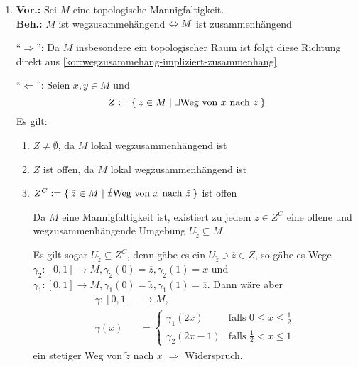 \begin{solution}[\ref{ub4:aufg1}]
    \begin{enumerate}[label=(\alph*)]
        \item \textbf{Vor.:} Sei $M$ eine topologische Mannigfaltigkeit.\\
              \textbf{Beh.:} $M$ ist wegzusammehängend $\Leftrightarrow M$ ist zusammenhängend
              \begin{beweis}
                \enquote{$\Rightarrow$}: Da $M$ insbesondere ein
                topologischer Raum ist folgt diese Richtung direkt
                aus \cref{kor:wegzusammehang-impliziert-zusammenhang}.

                \enquote{$\Leftarrow$}: Seien $x,y \in M$ und
                \[Z := \Set{z \in M | \exists \text{Weg von } x \text{ nach } z}\]
                Es gilt:
                \begin{enumerate}[label=(\roman*)]
                    \item $Z \neq \emptyset$, da $M$ lokal wegzusammenhängend ist
                    \item $Z$ ist offen, da $M$ lokal wegzusammenhängend ist
                    \item $Z^C := \Set{\tilde{z} \in M | \nexists \text{Weg von } x \text{ nach } \tilde{z}}$ ist offen

                    Da $M$ eine Mannigfaltigkeit ist, existiert zu jedem
                    $\tilde{z} \in Z^C$ eine offene und wegzusammenhängende Umgebung
                    $U_{\tilde{z}} \subseteq M$.

                    Es gilt sogar $U_{\tilde{z}} \subseteq Z^C$, denn
                    gäbe es ein $U_{\tilde{z}} \ni \overline{z} \in Z$,
                    so gäbe es Wege $\gamma_2:[0,1] \rightarrow M, \gamma_2(0) = \overline{z}, \gamma_2(1) = x$
                    und $\gamma_1:[0,1] \rightarrow M, \gamma_1(0) = \tilde{z}, \gamma_1(1) = \overline{z}$.
                    Dann wäre aber
                    \begin{align*}
                        \gamma:[0,1] &\rightarrow M,\\
                        \gamma(x) &= \begin{cases}
                            \gamma_1(2x)   &\text{falls } 0 \leq x \leq \frac{1}{2}\\
                            \gamma_2(2x-1) &\text{falls } \frac{1}{2} < x \leq 1
                            \end{cases}
                    \end{align*}
                    ein stetiger Weg von $\tilde{z}$ nach $x$
                    $\Rightarrow$ Widerspruch.


\end{enumerate}
\end{beweis}
\end{enumerate}
\end{solution}

